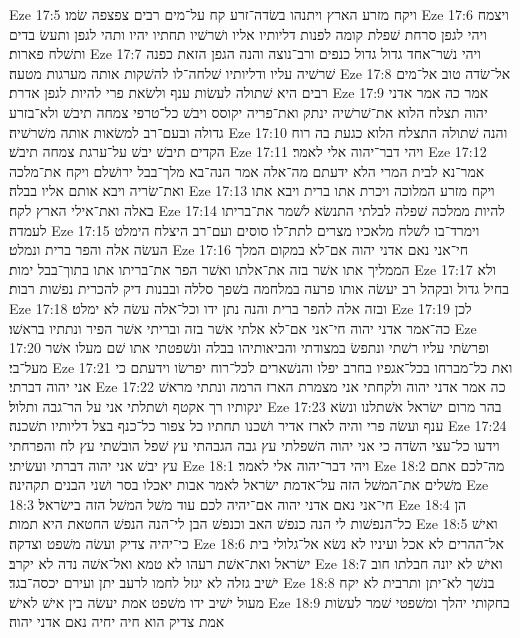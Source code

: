 Eze 17:5  ויקח מזרע הארץ ויתנהו בשׂדה־זרע קח על־מים רבים צפצפה שׂמו׃
Eze 17:6  ויצמח ויהי לגפן סרחת שׁפלת קומה לפנות דליותיו אליו ושׁרשׁיו תחתיו יהיו ותהי לגפן ותעשׂ בדים ותשׁלח פארות׃
Eze 17:7  ויהי נשׁר־אחד גדול גדול כנפים ורב־נוצה והנה הגפן הזאת כפנה שׁרשׁיה עליו ודליותיו שׁלחה־לו להשׁקות אותה מערגות מטעה׃
Eze 17:8  אל־שׂדה טוב אל־מים רבים היא שׁתולה לעשׂות ענף ולשׂאת פרי להיות לגפן אדרת׃
Eze 17:9  אמר כה אמר אדני יהוה תצלח הלוא את־שׁרשׁיה ינתק ואת־פריה יקוסס ויבשׁ כל־טרפי צמחה תיבשׁ ולא־בזרע גדולה ובעם־רב למשׂאות אותה משׁרשׁיה׃
Eze 17:10  והנה שׁתולה התצלח הלוא כגעת בה רוח הקדים תיבשׁ יבשׁ על־ערגת צמחה תיבשׁ׃
Eze 17:11  ויהי דבר־יהוה אלי לאמר׃
Eze 17:12  אמר־נא לבית המרי הלא ידעתם מה־אלה אמר הנה־בא מלך־בבל ירושׁלם ויקח את־מלכה ואת־שׂריה ויבא אותם אליו בבלה׃
Eze 17:13  ויקח מזרע המלוכה ויכרת אתו ברית ויבא אתו באלה ואת־אילי הארץ לקח׃
Eze 17:14  להיות ממלכה שׁפלה לבלתי התנשׂא לשׁמר את־בריתו לעמדה׃
Eze 17:15  וימרד־בו לשׁלח מלאכיו מצרים לתת־לו סוסים ועם־רב היצלח הימלט העשׂה אלה והפר ברית ונמלט׃
Eze 17:16  חי־אני נאם אדני יהוה אם־לא במקום המלך הממליך אתו אשׁר בזה את־אלתו ואשׁר הפר את־בריתו אתו בתוך־בבל ימות׃
Eze 17:17  ולא בחיל גדול ובקהל רב יעשׂה אותו פרעה במלחמה בשׁפך סללה ובבנות דיק להכרית נפשׁות רבות׃
Eze 17:18  ובזה אלה להפר ברית והנה נתן ידו וכל־אלה עשׂה לא ימלט׃
Eze 17:19  לכן כה־אמר אדני יהוה חי־אני אם־לא אלתי אשׁר בזה ובריתי אשׁר הפיר ונתתיו בראשׁו׃
Eze 17:20  ופרשׂתי עליו רשׁתי ונתפשׂ במצודתי והביאותיהו בבלה ונשׁפטתי אתו שׁם מעלו אשׁר מעל־בי׃
Eze 17:21  ואת כל־מברחו בכל־אגפיו בחרב יפלו והנשׁארים לכל־רוח יפרשׂו וידעתם כי אני יהוה דברתי׃
Eze 17:22  כה אמר אדני יהוה ולקחתי אני מצמרת הארז הרמה ונתתי מראשׁ ינקותיו רך אקטף ושׁתלתי אני על הר־גבה ותלול׃
Eze 17:23  בהר מרום ישׂראל אשׁתלנו ונשׂא ענף ועשׂה פרי והיה לארז אדיר ושׁכנו תחתיו כל צפור כל־כנף בצל דליותיו תשׁכנה׃
Eze 17:24  וידעו כל־עצי השׂדה כי אני יהוה השׁפלתי עץ גבה הגבהתי עץ שׁפל הובשׁתי עץ לח והפרחתי עץ יבשׁ אני יהוה דברתי ועשׂיתי׃
Eze 18:1  ויהי דבר־יהוה אלי לאמר׃
Eze 18:2  מה־לכם אתם משׁלים את־המשׁל הזה על־אדמת ישׂראל לאמר אבות יאכלו בסר ושׁני הבנים תקהינה׃
Eze 18:3  חי־אני נאם אדני יהוה אם־יהיה לכם עוד משׁל המשׁל הזה בישׂראל׃
Eze 18:4  הן כל־הנפשׁות לי הנה כנפשׁ האב וכנפשׁ הבן לי־הנה הנפשׁ החטאת היא תמות׃
Eze 18:5  ואישׁ כי־יהיה צדיק ועשׂה משׁפט וצדקה׃
Eze 18:6  אל־ההרים לא אכל ועיניו לא נשׂא אל־גלולי בית ישׂראל ואת־אשׁת רעהו לא טמא ואל־אשׁה נדה לא יקרב׃
Eze 18:7  ואישׁ לא יונה חבלתו חוב ישׁיב גזלה לא יגזל לחמו לרעב יתן ועירם יכסה־בגד׃
Eze 18:8  בנשׁך לא־יתן ותרבית לא יקח מעול ישׁיב ידו משׁפט אמת יעשׂה בין אישׁ לאישׁ׃
Eze 18:9  בחקותי יהלך ומשׁפטי שׁמר לעשׂות אמת צדיק הוא חיה יחיה נאם אדני יהוה׃
